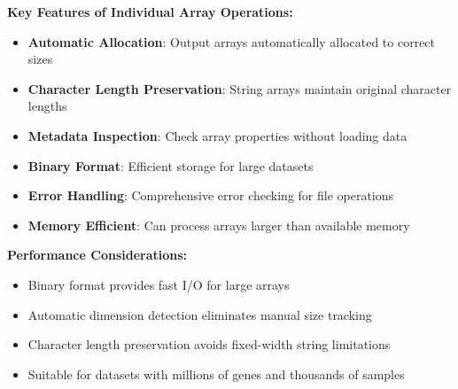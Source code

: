 \documentclass[11pt]{article}
\begin{document}
\begin{enumerate}
\begin{itemize}
	      	      \textbf{Key Features of Individual Array Operations:}
	      	      \begin{itemize}
	      	      	\item \textbf{Automatic Allocation}: Output arrays automatically allocated
	      	      	      to correct sizes
	      	      	      
	      	      	\item \textbf{Character Length Preservation}: String arrays maintain
	      	      	      original character lengths
	      	      	      
	      	      	\item \textbf{Metadata Inspection}: Check array properties without loading
	      	      	      data
	      	      	      
	      	      	\item \textbf{Binary Format}: Efficient storage for large datasets
	      	      	      
	      	      	\item \textbf{Error Handling}: Comprehensive error checking for file
	      	      	      operations
	      	      	      
	      	      	\item \textbf{Memory Efficient}: Can process arrays larger than available
	      	      	      memory
	      	      \end{itemize}
	      	      
	      	      \textbf{Performance Considerations:}
	      	      \begin{itemize}
	      	      	\item Binary format provides fast I/O for large arrays
	      	      	      
	      	      	\item Automatic dimension detection eliminates manual size tracking
	      	      	      
	      	      	\item Character length preservation avoids fixed-width string limitations
	      	      	      
	      	      	\item Suitable for datasets with millions of genes and thousands of samples
	      	      \end{itemize}
	      \end{itemize}
\end{enumerate}
\end{document}
